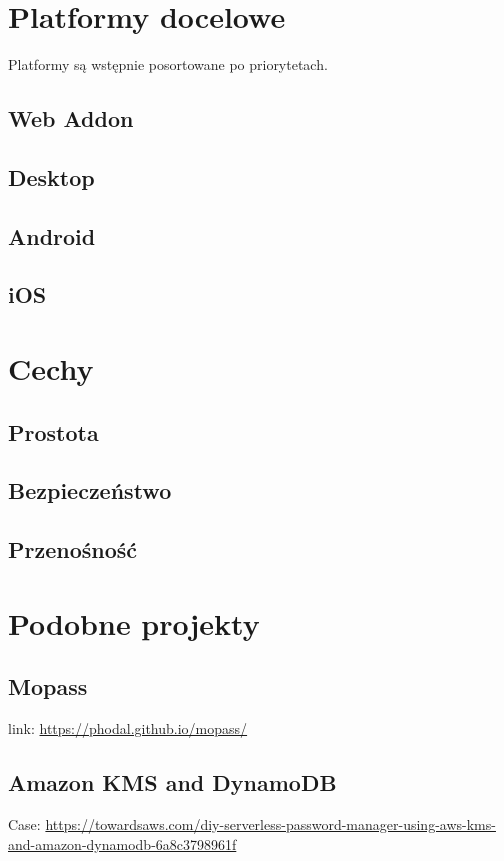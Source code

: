 \documentclass[11pt, a4paper]{article}
\begin{document}
\newpage

\section{Platformy docelowe}
Platformy są wstępnie posortowane po priorytetach.
\subsection{Web Addon}
\subsection{Desktop}
\subsection{Android}
\subsection{iOS}

\section{Cechy}
\subsection{Prostota}
\subsection{Bezpieczeństwo}
\subsection{Przenośność}

\section{Podobne projekty}

\subsection{Mopass}
link: \url{https://phodal.github.io/mopass/}

\subsection{Amazon KMS and DynamoDB}
Case: \url{https://towardsaws.com/diy-serverless-password-manager-using-aws-kms-and-amazon-dynamodb-6a8c3798961f}
\end{document}
